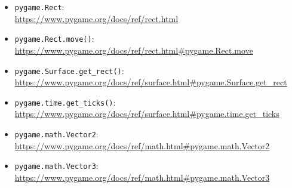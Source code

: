 \begin{itemize}

	\item \texttt{pygame.Rect}:
	\\
	\url{https://www.pygame.org/docs/ref/rect.html}
	
	\item \texttt{pygame.Rect.move()}:
    \\
    \url{https://www.pygame.org/docs/ref/rect.html#pygame.Rect.move}

	\item \texttt{pygame.Surface.get\_rect()}:
	\\
	\url{https://www.pygame.org/docs/ref/surface.html#pygame.Surface.get_rect}

	\item \texttt{pygame.time.get\_ticks()}:
    \\
    \url{https://www.pygame.org/docs/ref/surface.html#pygame.time.get_ticks}

    \item \texttt{pygame.math.Vector2}:
    \\
    \url{https://www.pygame.org/docs/ref/math.html#pygame.math.Vector2}

    \item \texttt{pygame.math.Vector3}:
    \\
    \url{https://www.pygame.org/docs/ref/math.html#pygame.math.Vector3}
\end{itemize}

